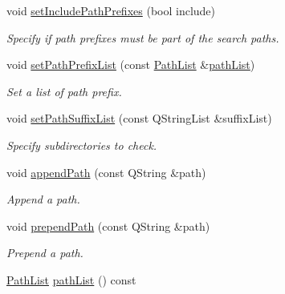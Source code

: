 \begin{DoxyCompactItemize}
\item 
void \hyperlink{class_mdt_1_1_file_system_1_1_search_path_list_ada890c31acde466a0adb741158c00046}{set\+Include\+Path\+Prefixes} (bool include)
\begin{DoxyCompactList}\small\item\em Specify if path prefixes must be part of the search paths. \end{DoxyCompactList}\item 
void \hyperlink{class_mdt_1_1_file_system_1_1_search_path_list_aa8980672ad2de4ec510276ae517b99c7}{set\+Path\+Prefix\+List} (const \hyperlink{class_mdt_1_1_file_system_1_1_path_list}{Path\+List} \&\hyperlink{class_mdt_1_1_file_system_1_1_search_path_list_a1ddaede41e8bd88bfd0580fe41250c53}{path\+List})
\begin{DoxyCompactList}\small\item\em Set a list of path prefix. \end{DoxyCompactList}\item 
void \hyperlink{class_mdt_1_1_file_system_1_1_search_path_list_a2d7bb5c00adcc75cbb9cc0d64402ddac}{set\+Path\+Suffix\+List} (const Q\+String\+List \&suffix\+List)
\begin{DoxyCompactList}\small\item\em Specify subdirectories to check. \end{DoxyCompactList}\item 
void \hyperlink{class_mdt_1_1_file_system_1_1_search_path_list_ab6fff8c60216e0227a62436d205dbf00}{append\+Path} (const Q\+String \&path)
\begin{DoxyCompactList}\small\item\em Append a path. \end{DoxyCompactList}\item 
void \hyperlink{class_mdt_1_1_file_system_1_1_search_path_list_a712058878ce5b37dcafe1cdf4db1a5ec}{prepend\+Path} (const Q\+String \&path)
\begin{DoxyCompactList}\small\item\em Prepend a path. \end{DoxyCompactList}\item 
\hyperlink{class_mdt_1_1_file_system_1_1_path_list}{Path\+List} \hyperlink{class_mdt_1_1_file_system_1_1_search_path_list_a1ddaede41e8bd88bfd0580fe41250c53}{path\+List} () const \hypertarget{class_mdt_1_1_file_system_1_1_search_path_list_a1ddaede41e8bd88bfd0580fe41250c53}{}\label{class_mdt_1_1_file_system_1_1_search_path_list_a1ddaede41e8bd88bfd0580fe41250c53}


\end{DoxyCompactItemize}
